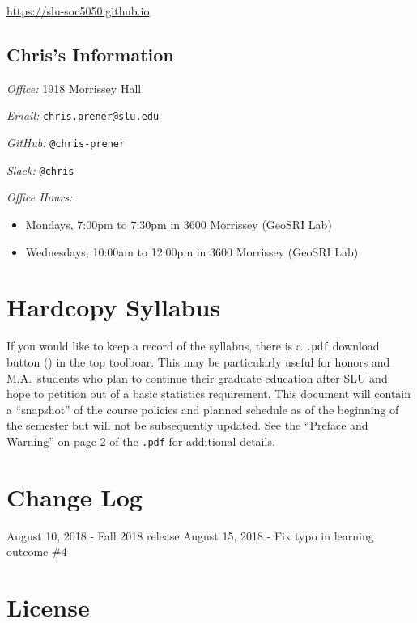 \documentclass[]{book}
\theoremstyle{definition}
\theoremstyle{definition}
\theoremstyle{definition}
\theoremstyle{remark}
\begin{document}
\url{https://slu-soc5050.github.io}

\hypertarget{chriss-information}{%
\subsection*{Chris's Information}\label{chriss-information}}

\emph{Office:} 1918 Morrissey Hall

\emph{Email:}
\href{mailto:chris.prener@slu.edu}{\nolinkurl{chris.prener@slu.edu}}

\emph{GitHub:} \texttt{@chris-prener}

\emph{Slack:} \texttt{@chris}

\emph{Office Hours:}

\begin{itemize}
\item
  Mondays, 7:00pm to 7:30pm in 3600 Morrissey (GeoSRI Lab)
\item
  Wednesdays, 10:00am to 12:00pm in 3600 Morrissey (GeoSRI Lab)
\end{itemize}

\hypertarget{hardcopy-syllabus}{%
\section*{Hardcopy Syllabus}\label{hardcopy-syllabus}}

If you would like to keep a record of the syllabus, there is a
\texttt{.pdf} download button () in the top toolboar. This may be
particularly useful for honors and M.A.~students who plan to continue
their graduate education after SLU and hope to petition out of a basic
statistics requirement. This document will contain a ``snapshot'' of the
course policies and planned schedule as of the beginning of the semester
but will not be subsequently updated. See the ``Preface and Warning'' on
page 2 of the \texttt{.pdf} for additional details.

\hypertarget{change-log}{%
\section*{Change Log}\label{change-log}}

August 10, 2018 - Fall 2018 release August 15, 2018 - Fix typo in
learning outcome \#4

\hypertarget{license}{%
\section*{License}\label{license}}
\end{document}
